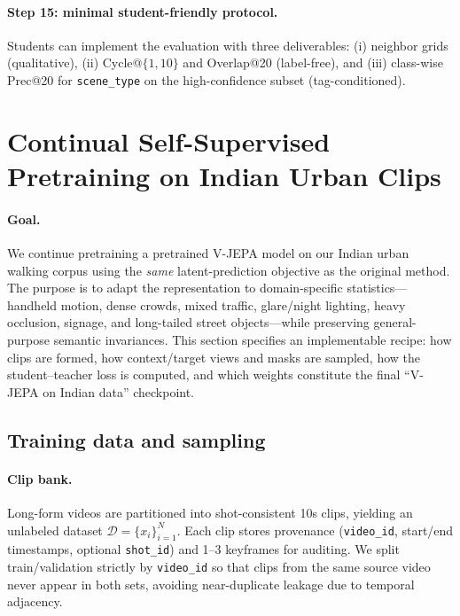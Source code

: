 \paragraph{Step 15: minimal student-friendly protocol.}
Students can implement the evaluation with three deliverables:
(i) neighbor grids (qualitative), 
(ii) Cycle@$\{1,10\}$ and Overlap@20 (label-free), and
(iii) class-wise Prec@20 for \texttt{scene\_type} on the high-confidence subset (tag-conditioned).

































\section{Continual Self-Supervised Pretraining on Indian Urban Clips}\label{sec:continual_pretraining}
\paragraph{Goal.} We continue pretraining a pretrained V-JEPA model on our Indian urban walking corpus using the \emph{same} latent-prediction objective as the original method. The purpose is to adapt the representation to domain-specific statistics---handheld motion, dense crowds, mixed traffic, glare/night lighting, heavy occlusion, signage, and long-tailed street objects---while preserving general-purpose semantic invariances. This section specifies an implementable recipe: how clips are formed, how context/target views and masks are sampled, how the student--teacher loss is computed, and which weights constitute the final ``V-JEPA on Indian data'' checkpoint.

\subsection{Training data and sampling}\label{sec:ctp_data}
\paragraph{Clip bank.} Long-form videos are partitioned into shot-consistent 10s clips, yielding an unlabeled dataset $\mathcal{D}=\{x_i\}_{i=1}^{N}$. Each clip stores provenance (\texttt{video\_id}, start/end timestamps, optional \texttt{shot\_id}) and 1--3 keyframes for auditing. We split train/validation strictly by \texttt{video\_id} so that clips from the same source video never appear in both sets, avoiding near-duplicate leakage due to temporal adjacency.
